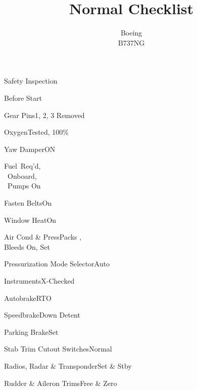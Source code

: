\documentclass[sim-use]{checklist}
\title{Normal Checklist}
\subtitle{Boeing \\ B737NG}
\begin{document}
 
\begin{checklist}{Safety Inspection}
\end{checklist}

\begin{checklist}{Before Start}
  \item{Gear Pins}{1, 2, 3 Removed}
  \item{Oxygen}{Tested, 100\%}
  \item{Yaw Damper}{ON}
  \item{Fuel}{\blank\ Req'd,\\\blank\ Onboard,\\\blank\ Pumps On}
  \item{Fasten Belts}{On}
  \item{Window Heat}{On}
  \item{Air Cond \& Press}{Packs \blank,\\Bleeds On, Set}
  \item{Pressurization Mode Selector}{Auto}
  \item{Instruments}{X-Checked}
  \item{Autobrake}{RTO}
  \item{Speedbrake}{Down Detent}
  \item{Parking Brake}{Set}
  \item{Stab Trim Cutout Switches}{Normal}
  \item{Radios, Radar \& Transponder}{Set \& Stby}
  \item{Rudder \& Aileron Trims}{Free \& Zero}
\end{checklist}
\end{document}

